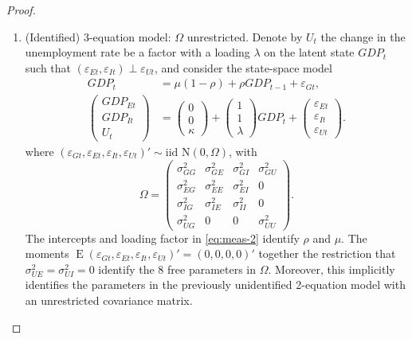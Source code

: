 \documentclass[oneside,reqno]{amsart}
\DeclareMathOperator{\E}{E}
\newcommand{\eps}{\varepsilon}
\newcommand{\N}{\mathrm N}
\theoremstyle{definition}
\begin{document}
\begin{enumerate}[label=(\roman*)]
\begin{proof}
\begin{enumerate}[label=(\arabic*)]
\item
(Identified) 3-equation model: $\Omega$ unrestricted. Denote by $U_t$ the change in the unemployment rate be a factor with a loading $\lambda$ on the latent state $GDP_t$ such that $(\eps_{Et}, \eps_{It}) \perp \eps_{Ut}$, and consider the state-space model  
\begin{align}
	GDP_t &= \mu(1-\rho) + \rho GDP_{t-1} + \eps_{Gt}, \label{eq:state-2} \\
	\begin{pmatrix}
		GDP_{Et}  \\ GDP_{It} \\ U_t
	\end{pmatrix} 
	&= \begin{pmatrix}
		0 \\ 0 \\ \kappa
	\end{pmatrix} 
	+ \begin{pmatrix}
		1 \\ 1 \\ \lambda		
	\end{pmatrix} GDP_t
	+ \begin{pmatrix}
		\eps_{Et} \\ \eps_{It} \\ \eps_{Ut}
	\end{pmatrix}  \label{eq:meas-2}.
\end{align}
where $(\eps_{Gt}, \eps_{Et}, \eps_{It}, \eps_{Ut})' \sim \text{iid } \N(0, \Omega)$, with 
\begin{equation}
	\Omega = \begin{pmatrix}
		\sigma_{GG}^2&\sigma_{GE}^2 &\sigma_{GI}^2&\sigma_{GU}^2 \\
		\sigma_{EG}^2 & \sigma_{EE}^2 & \sigma_{EI}^2 & 0\\
		\sigma_{IG}^2 & \sigma_{IE}^2 &  \sigma_{II}^2 & 0\\
		\sigma_{UG}^2 & 0 & 0 & \sigma_{UU}^2
	\end{pmatrix}.
\end{equation}
The intercepts and loading factor in \eqref{eq:meas-2}  identify $\rho$ and $\mu$. The moments $\E(\eps_{Gt}, \eps_{Et}, \eps_{It}, \eps_{Ut})' = (0,0,0,0)'$  together the restriction that $\sigma_{UE}^2 = \sigma_{UI}^2 = 0$ identify the 8 free parameters in $\Omega$. Moreover, this implicitly identifies the parameters in the previously unidentified 2-equation model with an unrestricted covariance matrix.
\end{enumerate}
\end{proof}

\end{enumerate}
\end{document}
